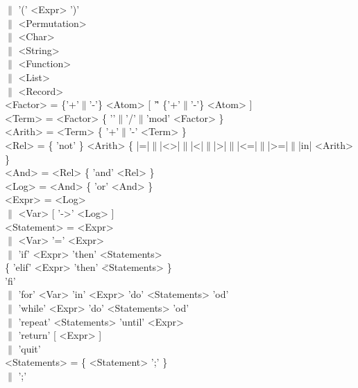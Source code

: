 \begin{tabbing}
               \>$\|$ \>'(' <Expr> ')'                                 \\
               \>$\|$ \><Permutation>                                  \\
               \>$\|$ \><Char>                                         \\
               \>$\|$ \><String>                                       \\
               \>$\|$ \><Function>                                     \\
               \>$\|$ \><List>                                         \\
               \>$\|$ \><Record>                                       \\
<Factor>       \>\:=  \>\{'+'$\|$'-'\} <Atom> [ '\^' \{'+'$\|$'-'\} <Atom> ]\\
<Term>         \>\:=  \><Factor> \{ '\*'$\|$'/'$\|$'mod' <Factor> \}   \\
<Arith>        \>\:=  \><Term> \{ '+'$\|$'-' <Term> \}                 \\
<Rel>          \>\:=  \>\{ 'not' \} <Arith>
       \{ |=|$\|$|<>|$\|$|<|$\|$|>|$\|$|<=|$\|$|>=|$\|$|in| <Arith> \} \\
<And>          \>\:=  \><Rel> \{ 'and' <Rel> \}                        \\
<Log>          \>\:=  \><And> \{ 'or' <And> \}                         \\
<Expr>         \>\:=  \><Log>                                          \\
               \>$\|$ \><Var> [ '->' <Log> ]                           \\
<Statement>    \>\:=  \><Expr>                                         \\
               \>$\|$ \><Var> '\:=' <Expr>                             \\
               \>$\|$ \>'if'   <Expr>  'then' <Statements>             \\
               \>     \>\{ 'elif' <Expr>  'then' \=<Statements> \}     \\
               \>       'fi'\\
               \>$\|$ \>'for' <Var> 'in' <Expr> 'do' <Statements> 'od' \\
               \>$\|$ \>'while' <Expr>  'do' <Statements>  'od'        \\
               \>$\|$ \>'repeat' <Statements>  'until' <Expr>          \\
               \>$\|$ \>'return' [ <Expr> ]                            \\
               \>$\|$ \>'quit'                                         \\
<Statements>   \>\:=  \>\{ <Statement> ';' \}                          \\
               \>$\|$ \>';'
\end{tabbing}


